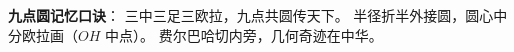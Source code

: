 \begin{summarybox}
\textbf{九点圆记忆口诀}：
三中三足三欧拉，九点共圆传天下。
半径折半外接圆，圆心中分欧拉画（$OH$ 中点）。
费尔巴哈切内旁，几何奇迹在中华。
\end{summarybox}